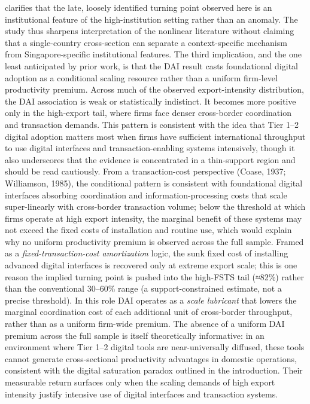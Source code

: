 \documentclass[12pt,a4paper]{article}
\begin{document}
clarifies that the late, loosely identified turning point observed here
is an institutional feature of the high-institution setting rather than
an anomaly. The study thus sharpens interpretation of the nonlinear
literature without claiming that a single-country cross-section can
separate a context-specific mechanism from Singapore-specific
institutional features. The third implication, and the one least
anticipated by prior work, is that the DAI result casts foundational
digital adoption as a conditional scaling resource rather than a uniform
firm-level productivity premium. Across much of the observed
export-intensity distribution, the DAI association is weak or
statistically indistinct. It becomes more positive only in the
high-export tail, where firms face denser cross-border coordination and
transaction demands. This pattern is consistent with the idea that Tier
1--2 digital adoption matters most when firms have sufficient
international throughput to use digital interfaces and
transaction-enabling systems intensively, though it also underscores
that the evidence is concentrated in a thin-support region and should be
read cautiously. From a transaction-cost perspective (Coase, 1937;
Williamson, 1985), the conditional pattern is consistent with
foundational digital interfaces absorbing coordination and
information-processing costs that scale super-linearly with cross-border
transaction volume; below the threshold at which firms operate at high
export intensity, the marginal benefit of these systems may not exceed
the fixed costs of installation and routine use, which would explain why
no uniform productivity premium is observed across the full sample.
Framed as a \emph{fixed-transaction-cost amortization} logic, the sunk
fixed cost of installing advanced digital interfaces is recovered only
at extreme export scale; this is one reason the implied turning point is
pushed into the high-FSTS tail (≈82\%) rather than the conventional
30--60\% range (a support-constrained estimate, not a precise
threshold). In this role DAI operates as a \emph{scale lubricant} that
lowers the marginal coordination cost of each additional unit of
cross-border throughput, rather than as a uniform firm-wide premium. The
absence of a uniform DAI premium across the full sample is itself
theoretically informative: in an environment where Tier 1--2 digital
tools are near-universally diffused, these tools cannot generate
cross-sectional productivity advantages in domestic operations,
consistent with the digital saturation paradox outlined in the
introduction. Their measurable return surfaces only when the scaling
demands of high export intensity justify intensive use of digital
interfaces and transaction systems.
\end{document}

